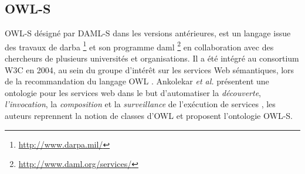 
    \subsection{OWL-S}
    \label{sec:owl-s}

    \textsc{OWL-S} \cite{martin2004owl} désigné par \textsc{DAML-S}
    \cite{ankolekar2002daml} dans les versions antérieures, est un
    langage issue des travaux de \acrshort{darba}
    \footnote{\url{http://www.darpa.mil/}} et son programme
    \acrshort{daml} \footnote{\url{http://www.daml.org/services/}} en
    collaboration avec des chercheurs de plusieurs universités et
    organisations. Il a été intégré au consortium \textsc{W3C} en
    2004, au sein du groupe d'intérêt sur les services Web
    sémantiques, lors de la recommandation du langage \textsc{OWL}
    \cite{horrocks2002daml+oil, mcguinness2004owl}. Ankolekar \emph{et
      al.}  \cite{ankolekar2002daml} présentent une ontologie pour les
    services web dans le but d'automatiser la \emph{découverte},
    \emph{l'invocation}, la \emph{composition} et la
    \emph{surveillance} de l'exécution de services
    \cite{mcilraith2003bringing}, les auteurs reprennent la notion de
    classes d'\textsc{OWL} et proposent l'ontologie \textsc{OWL-S}.
    

